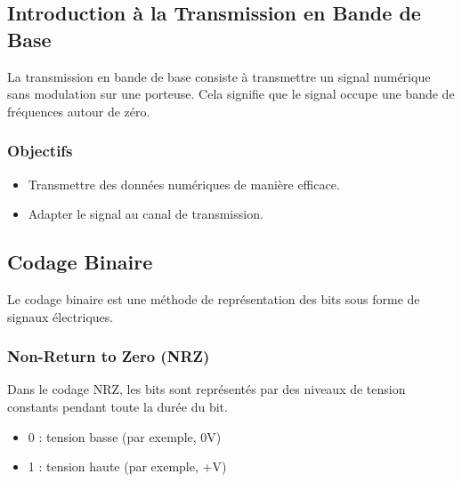 \documentclass[10pt,a4paper]{article}
\begin{document}
\subsection*{Introduction à la Transmission en Bande de Base}
La transmission en bande de base consiste à transmettre un signal numérique sans modulation sur une porteuse. Cela signifie que le signal occupe une bande de fréquences autour de zéro.

\subsubsection*{Objectifs}
\begin{itemize}
    \item Transmettre des données numériques de manière efficace.
    \item Adapter le signal au canal de transmission.
\end{itemize}

\subsection*{Codage Binaire}
Le codage binaire est une méthode de représentation des bits sous forme de signaux électriques.

\subsubsection*{Non-Return to Zero (NRZ)}
Dans le codage NRZ, les bits sont représentés par des niveaux de tension constants pendant toute la durée du bit.
\begin{itemize}
    \item 0 : tension basse (par exemple, 0V)
    \item 1 : tension haute (par exemple, +V)
\end{itemize}

\end{document}
